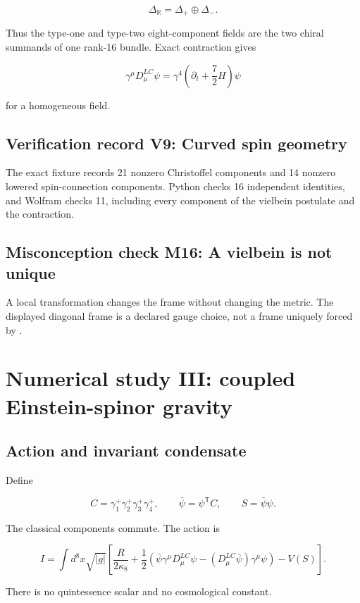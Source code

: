 \documentclass[11pt]{article}
\begin{document}
\[
\Delta_{\mathbb R}=\Delta_+\oplus\Delta_-.
\]

Thus the type-one and type-two eight-component fields are the two chiral summands of one rank-16 bundle. Exact contraction gives

\[
\gamma^\mu D^{LC}_\mu\psi
=\gamma^4\left(\partial_t+\frac72H\right)\psi
\]

for a homogeneous field.

\subsection{Verification record V9: Curved spin geometry}

The exact fixture records 21 nonzero Christoffel components and 14 nonzero lowered spin-connection components. Python checks 16 independent identities, and Wolfram checks 11, including every component of the vielbein postulate and the \texttt{} contraction.

\subsection{Misconception check M16: A vielbein is not unique}

A local \texttt{} transformation changes the frame without changing the metric. The displayed diagonal frame is a declared gauge choice, not a frame uniquely forced by \texttt{}.

\section{Numerical study III: coupled Einstein-spinor gravity}

\subsection{Action and invariant condensate}

Define

\[
C=\gamma_1^+\gamma_2^+\gamma_3^+\gamma_4^+,
\qquad
\bar\psi=\psi^{\mathsf T}C,
\qquad
S=\bar\psi\psi.
\]

The classical components commute. The action is

\[
I=\int d^8x\sqrt{|g|}\left[
\frac{R}{2\kappa_8}
+\frac12(\bar\psi\gamma^\mu D^{LC}_\mu\psi
-(D^{LC}_\mu\bar\psi)\gamma^\mu\psi)-V(S)\right].
\]

There is no quintessence scalar and no cosmological constant.
\end{document}
